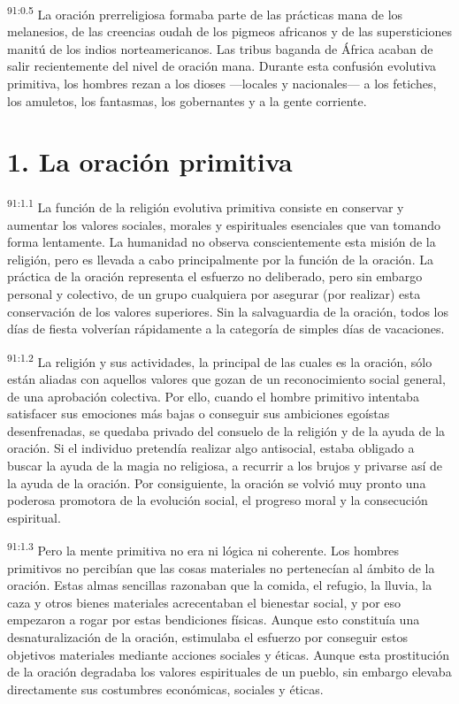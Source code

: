 \par
\textsuperscript{91:0.5} La oración prerreligiosa formaba parte de las prácticas mana de los melanesios, de las creencias oudah de los pigmeos africanos y de las supersticiones manitú de los indios norteamericanos. Las tribus baganda de África acaban de salir recientemente del nivel de oración mana. Durante esta confusión evolutiva primitiva, los hombres rezan a los dioses ---locales y nacionales--- a los fetiches, los amuletos, los fantasmas, los gobernantes y a la gente corriente.

\section*{1. La oración primitiva}
\par
\textsuperscript{91:1.1} La función de la religión evolutiva primitiva consiste en conservar y aumentar los valores sociales, morales y espirituales esenciales que van tomando forma lentamente. La humanidad no observa conscientemente esta misión de la religión, pero es llevada a cabo principalmente por la función de la oración. La práctica de la oración representa el esfuerzo no deliberado, pero sin embargo personal y colectivo, de un grupo cualquiera por asegurar (por realizar) esta conservación de los valores superiores. Sin la salvaguardia de la oración, todos los días de fiesta volverían rápidamente a la categoría de simples días de vacaciones.

\par
\textsuperscript{91:1.2} La religión y sus actividades, la principal de las cuales es la oración, sólo están aliadas con aquellos valores que gozan de un reconocimiento social general, de una aprobación colectiva. Por ello, cuando el hombre primitivo intentaba satisfacer sus emociones más bajas o conseguir sus ambiciones egoístas desenfrenadas, se quedaba privado del consuelo de la religión y de la ayuda de la oración. Si el individuo pretendía realizar algo antisocial, estaba obligado a buscar la ayuda de la magia no religiosa, a recurrir a los brujos y privarse así de la ayuda de la oración. Por consiguiente, la oración se volvió muy pronto una poderosa promotora de la evolución social, el progreso moral y la consecución espiritual.

\par
\textsuperscript{91:1.3} Pero la mente primitiva no era ni lógica ni coherente. Los hombres primitivos no percibían que las cosas materiales no pertenecían al ámbito de la oración. Estas almas sencillas razonaban que la comida, el refugio, la lluvia, la caza y otros bienes materiales acrecentaban el bienestar social, y por eso empezaron a rogar por estas bendiciones físicas. Aunque esto constituía una desnaturalización de la oración, estimulaba el esfuerzo por conseguir estos objetivos materiales mediante acciones sociales y éticas. Aunque esta prostitución de la oración degradaba los valores espirituales de un pueblo, sin embargo elevaba directamente sus costumbres económicas, sociales y éticas.

